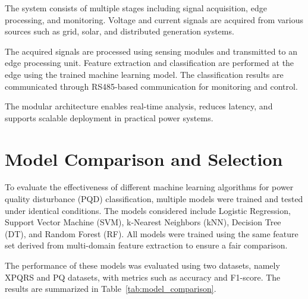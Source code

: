 \documentclass[conference]{IEEEtran}
\begin{document}
The system consists of multiple stages including signal acquisition, edge processing, and monitoring. Voltage and current signals are acquired from various sources such as grid, solar, and distributed generation systems.

The acquired signals are processed using sensing modules and transmitted to an edge processing unit. Feature extraction and classification are performed at the edge using the trained machine learning model. The classification results are communicated through RS485-based communication for monitoring and control.

The modular architecture enables real-time analysis, reduces latency, and supports scalable deployment in practical power systems.

\section{Model Comparison and Selection}

To evaluate the effectiveness of different machine learning algorithms for power quality disturbance (PQD) classification, multiple models were trained and tested under identical conditions. The models considered include Logistic Regression, Support Vector Machine (SVM), k-Nearest Neighbors (kNN), Decision Tree (DT), and Random Forest (RF). All models were trained using the same feature set derived from multi-domain feature extraction to ensure a fair comparison.

The performance of these models was evaluated using two datasets, namely XPQRS and PQ datasets, with metrics such as accuracy and F1-score. The results are summarized in Table~\ref{tab:model_comparison}.
\begin{table}[h]
\centering
\caption{Performance Comparison of Models}
\label{tab:model_comparison}
\end{table}
\end{document}
